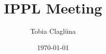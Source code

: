

\title[\today]{IPPL Meeting}

\author{Tobia Claglüna}
\date{\today}
\def \myEmail {tobia.clagluena@psi.ch}







